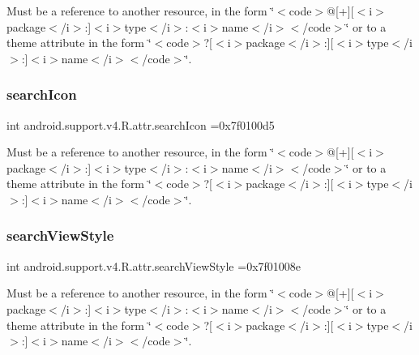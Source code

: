 Must be a reference to another resource, in the form \char`\"{}$<$code$>$@\mbox{[}+\mbox{]}\mbox{[}$<$i$>$package$<$/i$>$\+:\mbox{]}$<$i$>$type$<$/i$>$\+:$<$i$>$name$<$/i$>$$<$/code$>$\char`\"{} or to a theme attribute in the form \char`\"{}$<$code$>$?\mbox{[}$<$i$>$package$<$/i$>$\+:\mbox{]}\mbox{[}$<$i$>$type$<$/i$>$\+:\mbox{]}$<$i$>$name$<$/i$>$$<$/code$>$\char`\"{}. \mbox{\label{classandroid_1_1support_1_1v4_1_1R_1_1attr_ac9676ddfff5eaae3a4675c648675472f}} 
\subsubsection{\texorpdfstring{search\+Icon}{searchIcon}}
{\footnotesize\ttfamily int android.\+support.\+v4.\+R.\+attr.\+search\+Icon =0x7f0100d5\hspace{0.3cm}{\ttfamily [static]}}

Must be a reference to another resource, in the form \char`\"{}$<$code$>$@\mbox{[}+\mbox{]}\mbox{[}$<$i$>$package$<$/i$>$\+:\mbox{]}$<$i$>$type$<$/i$>$\+:$<$i$>$name$<$/i$>$$<$/code$>$\char`\"{} or to a theme attribute in the form \char`\"{}$<$code$>$?\mbox{[}$<$i$>$package$<$/i$>$\+:\mbox{]}\mbox{[}$<$i$>$type$<$/i$>$\+:\mbox{]}$<$i$>$name$<$/i$>$$<$/code$>$\char`\"{}. \mbox{\label{classandroid_1_1support_1_1v4_1_1R_1_1attr_a5814aa596bd1d0d9ca38992ec80a0507}} 
\subsubsection{\texorpdfstring{search\+View\+Style}{searchViewStyle}}
{\footnotesize\ttfamily int android.\+support.\+v4.\+R.\+attr.\+search\+View\+Style =0x7f01008e\hspace{0.3cm}{\ttfamily [static]}}

Must be a reference to another resource, in the form \char`\"{}$<$code$>$@\mbox{[}+\mbox{]}\mbox{[}$<$i$>$package$<$/i$>$\+:\mbox{]}$<$i$>$type$<$/i$>$\+:$<$i$>$name$<$/i$>$$<$/code$>$\char`\"{} or to a theme attribute in the form \char`\"{}$<$code$>$?\mbox{[}$<$i$>$package$<$/i$>$\+:\mbox{]}\mbox{[}$<$i$>$type$<$/i$>$\+:\mbox{]}$<$i$>$name$<$/i$>$$<$/code$>$\char`\"{}. \mbox{\label{classandroid_1_1support_1_1v4_1_1R_1_1attr_a1ad9bf745f8300ae35266d3f158e4ae1}} 

